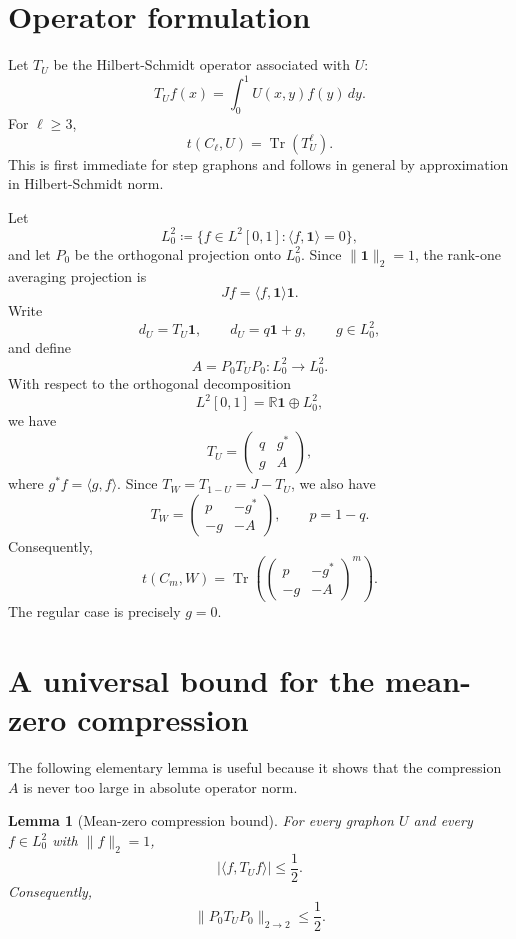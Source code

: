 \documentclass[11pt]{article}
\newtheorem{lemma}[theorem]{Lemma}
\theoremstyle{definition}
\theoremstyle{remark}
\newcommand{\one}{\mathbf 1}
\newcommand{\ip}[2]{\langle #1,#2\rangle}
\newcommand{\Tr}{\operatorname{Tr}}
\newcommand{\defeq}{\coloneqq}
\newcommand{\R}{\mathbb R}
\begin{document}
\section{Operator formulation}

Let $T_U$ be the Hilbert-Schmidt operator associated with $U$:
\[
  T_U f(x)=\int_0^1 U(x,y)f(y)\,dy.
\]
For $\ell\ge3$,
\[
  t(C_\ell,U)=\Tr(T_U^\ell).
\]
This is first immediate for step graphons and follows in general by approximation in Hilbert-Schmidt norm.

Let
\[
  L^2_0\defeq \{f\in L^2[0,1]:\ip{f}{\one}=0\},
\]
and let $P_0$ be the orthogonal projection onto $L^2_0$.  Since $\|\one\|_2=1$, the rank-one averaging projection is
\[
  Jf=\ip{f}{\one}\one.
\]
Write
\[
  d_U=T_U\one,
  \qquad
  d_U=q\one+g,
  \qquad
  g\in L^2_0,
\]
and define
\[
  A=P_0T_UP_0\colon L^2_0\to L^2_0.
\]
With respect to the orthogonal decomposition
\[
  L^2[0,1]=\R\one\oplus L^2_0,
\]
we have
\begin{equation}\label{eq:block-TU}
  T_U=
  \begin{pmatrix}
    q & g^*\\
    g & A
  \end{pmatrix},
\end{equation}
where $g^*f=\ip{g}{f}$.  Since $T_W=T_{1-U}=J-T_U$, we also have
\begin{equation}\label{eq:block-TW}
  T_W=
  \begin{pmatrix}
    p & -g^*\\
    -g & -A
  \end{pmatrix},
  \qquad p=1-q.
\end{equation}
Consequently,
\[
  t(C_m,W)=\Tr\left(
  \begin{pmatrix}
    p & -g^*\\
    -g & -A
  \end{pmatrix}^{m}\right).
\]
The regular case is precisely $g=0$.

\section{A universal bound for the mean-zero compression}

The following elementary lemma is useful because it shows that the compression $A$ is never too large in absolute operator norm.

\begin{lemma}[Mean-zero compression bound]\label{lem:compression-half}
For every graphon $U$ and every $f\in L^2_0$ with $\|f\|_2=1$,
\[
  \left|\ip{f}{T_Uf}\right|\le \frac12.
\]
Consequently,
\[
  \|P_0T_UP_0\|_{2\to2}\le \frac12.
\]
\end{lemma}
\end{document}
